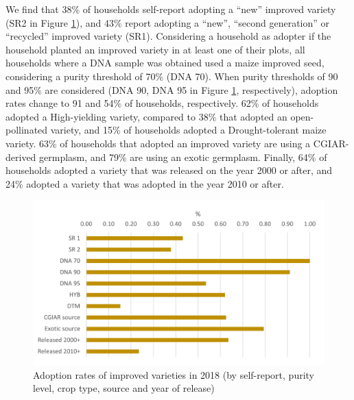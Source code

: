 \documentclass{article}
\begin{document}
We find that 38\% of households self-report adopting a “new” improved variety (SR2 in Figure \ref{fig:adoption_r4}), and 43\% report adopting a “new”, “second generation” or “recycled” improved variety (SR1). Considering a household as adopter if the household planted an improved variety in at least one of their plots, all households where a DNA sample was obtained used a maize improved seed, considering a purity threshold of 70\% (DNA 70). When purity thresholds of 90 and 95\% are considered (DNA 90, DNA 95 in Figure \ref{fig:adoption_r4}, respectively), adoption rates change to 91 and 54\% of households, respectively. 62\% of households adopted a High-yielding variety, compared to 38\% that adopted an open-pollinated variety, and 15\% of households adopted a Drought-tolerant maize variety. 63\% of households that adopted an improved variety are using a CGIAR-derived germplasm, and 79\% are using an exotic germplasm. Finally, 64\% of households adopted a variety that was released on the year 2000 or after, and 24\% adopted a variety that was adopted in the year 2010 or after.

\begin{figure}
    \centering
    \includegraphics{results/figures/adoption_r4.png}
    \caption{Adoption rates of improved varieties in 2018 (by self-report, purity level, crop type, source and year of release)}
    \label{fig:adoption_r4}
\end{figure}
\end{document}
